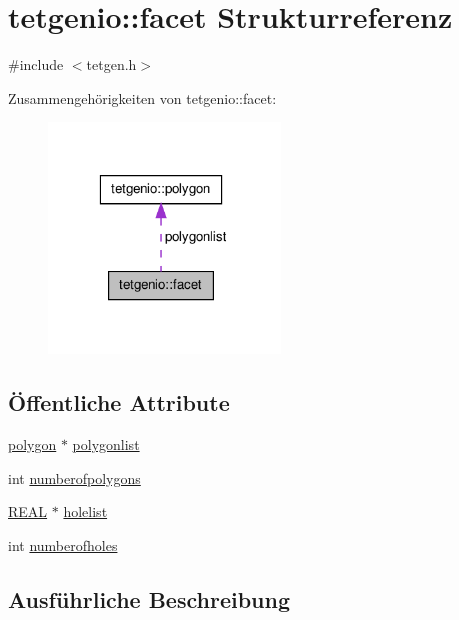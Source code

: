 \hypertarget{structtetgenio_1_1facet}{\section{tetgenio\-:\-:facet Strukturreferenz}
\label{structtetgenio_1_1facet}
}


{\ttfamily \#include $<$tetgen.\-h$>$}



Zusammengehörigkeiten von tetgenio\-:\-:facet\-:
\nopagebreak
\begin{figure}[H]
\begin{center}
\leavevmode
\includegraphics[width=175pt]{structtetgenio_1_1facet__coll__graph}
\end{center}
\end{figure}
\subsection*{Öffentliche Attribute}
\begin{DoxyCompactItemize}
\item 
\hyperlink{structtetgenio_1_1polygon}{polygon} $\ast$ \hyperlink{structtetgenio_1_1facet_ad73474fc4f07efdd714f0441948c5dfa}{polygonlist}
\item 
int \hyperlink{structtetgenio_1_1facet_a845d93a1341532b2f0de8b1e75a5d0bb}{numberofpolygons}
\item 
\hyperlink{tetgen_8h_a4b654506f18b8bfd61ad2a29a7e38c25}{R\-E\-A\-L} $\ast$ \hyperlink{structtetgenio_1_1facet_aecc34fbcd7087b45baecf2ba43d57757}{holelist}
\item 
int \hyperlink{structtetgenio_1_1facet_acc9857df4007aa20199f8979353339c7}{numberofholes}
\end{DoxyCompactItemize}


\subsection{Ausführliche Beschreibung}


